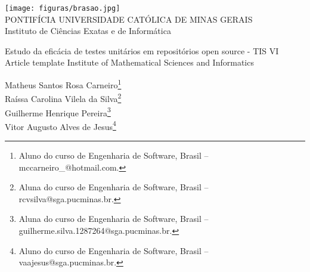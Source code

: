 \documentclass[a4paper,12pt,Times]{article}
\makeatletter
\newcommand{\monog}{Estudo da eficácia de testes unitários em repositórios open source - TIS VI}
\newcommand{\monogES}{Article template Institute of Mathematical Sciences and Informatics}
\newcommand{\origem}{Brasil }
\newcommand{\AutorA}{Matheus Santos Rosa Carneiro}
\newcommand{\funcaoA}{}
\newcommand{\emailA}{mccarneiro_@hotmail.com}
\newcommand{\cursA}{Aluno do curso de Engenharia de Software}
\newcommand{\AutorB}{Raíssa Carolina Vilela da Silva}
\newcommand{\funcaoB}{}
\newcommand{\emailB}{rcvsilva@sga.pucminas.br}
\newcommand{\cursB}{Aluna do curso de Engenharia de Software}
\newcommand{\AutorC}{Guilherme Henrique Pereira}
\newcommand{\funcaoC}{}
\newcommand{\emailC}{guilherme.silva.1287264@sga.pucminas.br}
\newcommand{\cursC}{Aluna do curso de Engenharia de Software}
\newcommand{\AutorD}{Vitor Augusto Alves de Jesus}
\newcommand{\funcaoD}{}
\newcommand{\emailD}{vaajesus@sga.pucminas.br}
\newcommand{\cursD}{Aluno do curso de Engenharia de Software}
\newcommand{\keyword}[1]{\textsf{#1}}
\makeatother
\begin{document}

\begin{center}
\texttt{[image: figuras/brasao.jpg]} \\
PONTIFÍCIA UNIVERSIDADE CATÓLICA DE MINAS GERAIS \\
Instituto de Ciências Exatas e de Informática


\end{center}

 \vspace{0cm} {
 \singlespacing \Large{\monog {} \\ }
  \normalsize{\monogES}
 }

\vspace{1.0cm}

\begin{flushright}
\singlespacing 
\normalsize{\AutorA \footnote{\funcaoA \cursA, \origem -- \emailA . }} \\
\normalsize{\AutorB \footnote{\funcaoB \cursB, \origem -- \emailB . }} \\
\normalsize{\AutorC \footnote{\funcaoC \cursC, \origem -- \emailC . }} \\
\normalsize{\AutorD \footnote{\funcaoD \cursD, \origem -- \emailD . }} \\
\end{flushright}
\thispagestyle{empty}

\vspace{1.0cm}

\begin{abstract}
\noindent
O resumo deverá conter pelo menos cento e cinquenta palavras de acordo com o padrão de normalização da ABNT.
Este artigo irá abordar as principais linguagens de programação voltadas a ambiente WEB usadas atualmente, 
comparando suas características de maneira a indicar o melhor uso para determinada linguagem. 
As linguagens serão divididas de acordo com 4 principais características: Interpretadas, compiladas, server-side e client-side.
O resumo deverá conter pelo menos cento e cinquenta palavras de acordo com o padrão de normalização da ABNT.
as linguagens serão divididas de acordo com 4 principais características: Interpretadas, compiladas, server-side e client-side.
O resumo deverá conter pelo menos cento e cinquenta palavras de acordo com o padrão de normalização da ABNT.
\\\textbf{\keyword{Palavras-chave: }} Template. \LaTeX. Abakos. Periódicos.
\end{abstract}
\end{document}

